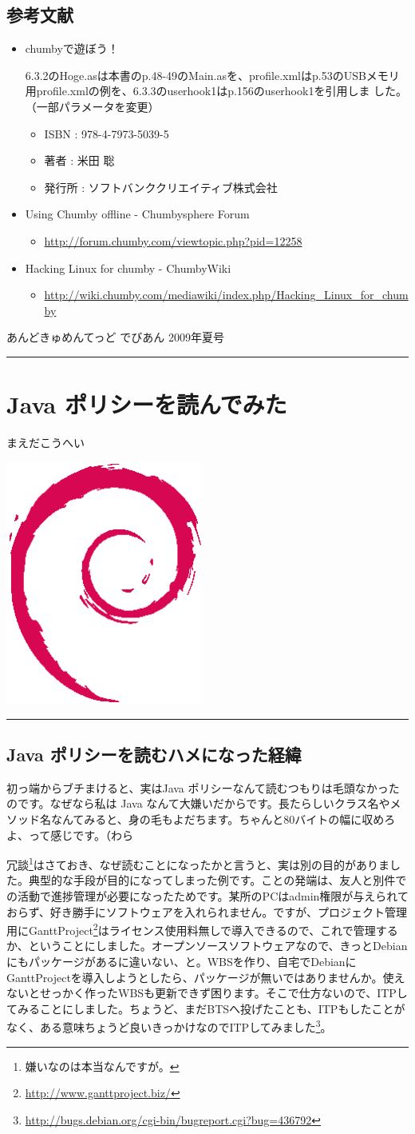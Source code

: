 \documentclass[mingoth,a4paper]{jsarticle}
\renewcommand{\dancersection}[2]{%
\newpage
あんどきゅめんてっど でびあん 2009年夏号
%
\vspace{0.1mm}\\
{\color{dancerlightblue}\rule{\hsize}{2mm}}

%
%
\begin{minipage}[t]{0.6\hsize}
\color{dancerdarkblue}
\vspace{1cm}
\section{#1}
\hfill{}#2\\
\end{minipage}
\begin{minipage}[t]{0.4\hsize}
\vspace{-2cm}
\hfill{}\includegraphics[height=8cm]{image200502/openlogo-nd.eps}\\
\vspace{-5cm}
\end{minipage}
%
%
{\color{dancerdarkblue}\rule{0.74\hsize}{2mm}}
%
\vspace{2cm}
}
\begin{document}
\subsection{参考文献}
\begin{itemize}
\item chumbyで遊ぼう！

6.3.2のHoge.asは本書のp.48-49のMain.asを、profile.xmlはp.53のUSBメモリ
      用profile.xmlの例を、6.3.3のuserhook1はp.156のuserhook1を引用しま
      した。（一部パラメータを変更）

\begin{itemize}
\item ISBN : 978-4-7973-5039-5
\item 著者 : 米田 聡
\item 発行所 : ソフトバンククリエイティブ株式会社
\end{itemize}
\item Using Chumby offline  - Chumbysphere Forum
\begin{itemize}
\item \url{http://forum.chumby.com/viewtopic.php?pid=12258}
\end{itemize}
\item Hacking Linux for chumby - ChumbyWiki
\begin{itemize}
\item \url{http://wiki.chumby.com/mediawiki/index.php/Hacking_Linux_for_chumby}
\end{itemize}
\end{itemize}

\dancersection{Java ポリシーを読んでみた}{まえだこうへい}

\subsection{Java ポリシーを読むハメになった経緯}

初っ端からブチまけると、実はJava ポリシーなんて読むつもりは毛頭なかったのです。なぜなら私は Java なんて大嫌いだからです。長たらしいクラス名やメソッド名なんてみると、身の毛もよだちます。ちゃんと80バイトの幅に収めろよ、って感じです。（わら

冗談\footnote{嫌いなのは本当なんですが。}はさておき、なぜ読むことになったかと言うと、実は別の目的がありました。典型的な手段が目的になってしまった例です。ことの発端は、友人と別件での活動で進捗管理が必要になったためです。某所のPCはadmin権限が与えられておらず、好き勝手にソフトウェアを入れられません。ですが、プロジェクト管理用にGanttProject\footnote{\url{http://www.ganttproject.biz/}}はライセンス使用料無しで導入できるので、これで管理するか、ということにしました。オープンソースソフトウェアなので、きっとDebianにもパッケージがあるに違いない、と。WBSを作り、自宅でDebianにGanttProjectを導入しようとしたら、パッケージが無いではありませんか。使えないとせっかく作ったWBSも更新できず困ります。そこで仕方ないので、ITPしてみることにしました。ちょうど、まだBTSへ投げたことも、ITPもしたことがなく、ある意味ちょうど良いきっかけなのでITPしてみました\footnote{\url{http://bugs.debian.org/cgi-bin/bugreport.cgi?bug=436792}}。
\end{document}

